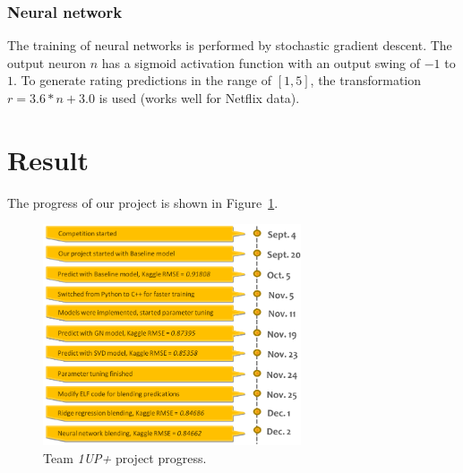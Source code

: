 \documentclass[journal]{IEEEtran}
\begin{document}
\subsubsection{Neural network}
The training of neural networks is performed by stochastic gradient descent. The output neuron $n$ has a sigmoid activation function with an output swing of $-1$ to $1$. To generate rating predictions in the range of $[1, 5]$, the transformation $r = 3.6*n + 3.0$ is used (works well for Netflix data). 


\section{Result}
The progress of our project is shown in Figure~\ref{fig3}. 

\begin{figure}[ht]
\begin{center}
\includegraphics[width=3in]{fig/progress}
\vspace{-2mm}
\caption{Team {\it 1UP+} project progress.}
\label{fig3}
\end{center}
\end{figure}
\end{document}
